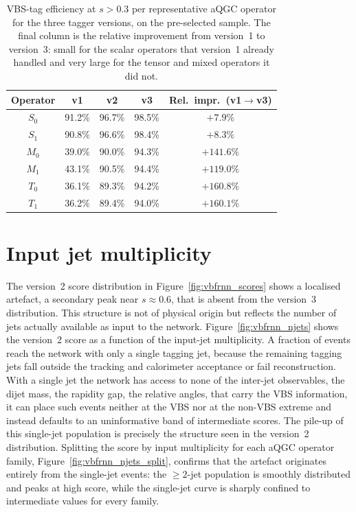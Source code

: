\begin{table}[htbp]
  \centering
  \caption{VBS-tag efficiency at $s>0.3$ per representative aQGC operator for the three tagger versions, on the pre-selected sample. The final column is the relative improvement from version~1 to version~3: small for the scalar operators that version~1 already handled and very large for the tensor and mixed operators it did not.}
  \label{tab:vbfrnn_aqgc_eff}
  \begin{tabular}{|c|c|c|c|c|}
    \hline
    \textbf{Operator} & \textbf{v1} & \textbf{v2} & \textbf{v3} & \textbf{Rel.\ impr.\ (v1$\to$v3)} \\
    \hline
    $S_0$ & 91.2\% & 96.7\% & 98.5\% & $+7.9\%$ \\
    $S_1$ & 90.8\% & 96.6\% & 98.4\% & $+8.3\%$ \\
    $M_0$ & 39.0\% & 90.0\% & 94.3\% & $+141.6\%$ \\
    $M_1$ & 43.1\% & 90.5\% & 94.4\% & $+119.0\%$ \\
    $T_0$ & 36.1\% & 89.3\% & 94.2\% & $+160.8\%$ \\
    $T_1$ & 36.2\% & 89.4\% & 94.0\% & $+160.1\%$ \\
    \hline
  \end{tabular}
\end{table}

\section{Input jet multiplicity}
\label{sec:vbfrnn_multiplicity}

The version~2 score distribution in Figure~\ref{fig:vbfrnn_scores} shows a localised artefact, a secondary peak near $s\approx0.6$, that is absent from the version~3 distribution. This structure is not of physical origin but reflects the number of jets actually available as input to the network. Figure~\ref{fig:vbfrnn_njets} shows the version~2 score as a function of the input-jet multiplicity. A fraction of events reach the network with only a single tagging jet, because the remaining tagging jets fall outside the tracking and calorimeter acceptance or fail reconstruction. With a single jet the network has access to none of the inter-jet observables, the dijet mass, the rapidity gap, the relative angles, that carry the VBS information, it can place such events neither at the VBS nor at the non-VBS extreme and instead defaults to an uninformative band of intermediate scores. The pile-up of this single-jet population is precisely the structure seen in the version~2 distribution. Splitting the score by input multiplicity for each aQGC operator family, Figure~\ref{fig:vbfrnn_njets_split}, confirms that the artefact originates entirely from the single-jet events: the $\geq2$-jet population is smoothly distributed and peaks at high score, while the single-jet curve is sharply confined to intermediate values for every family.

